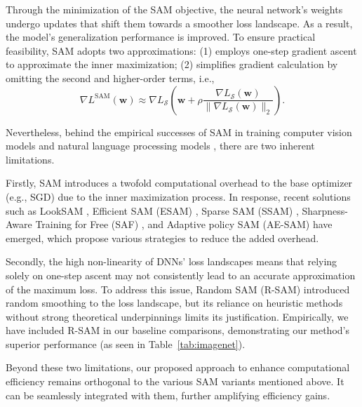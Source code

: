 \documentclass[letterpaper]{article} %
\theoremstyle{plain}
\theoremstyle{definition}
\newcommand{\tref}[1]{Table~\ref{#1}}
\begin{document}
Through the minimization of the SAM objective, the neural network's weights undergo updates that shift them towards a smoother loss landscape. As a result, the model's generalization performance is improved. To ensure practical feasibility, SAM adopts two approximations: (1) employs one-step gradient ascent to approximate the inner maximization; (2) simplifies gradient calculation by omitting the second and higher-order terms, i.e.,
\begin{equation}\label{eq:sam-approx}
\nabla L^{\operatorname{SAM}}(\boldsymbol{w}) \approx \nabla L_{\mathcal{S}}\left(\boldsymbol{w}+\rho \frac{\nabla L_{\mathcal{S}}(\boldsymbol{w})} {\|\nabla L_{\mathcal{S}}(\boldsymbol{w})\|_2}\right).
\end{equation}

Nevertheless, behind the empirical successes of SAM in training computer vision models \cite{foret2021sharpnessaware,chen2022when} and natural language processing models \cite{bahri2021sharpness}, there are two inherent limitations.

Firstly, SAM introduces a twofold computational overhead to the base optimizer (e.g., SGD) due to the inner maximization process. In response, recent solutions such as LookSAM \cite{liu2022towards}, Efficient SAM (ESAM) \cite{du2022efficient}, Sparse SAM (SSAM) \cite{mi2022make}, Sharpness-Aware Training for Free (SAF) \cite{du2022sharpness}, and Adaptive policy SAM (AE-SAM) \cite{jiang2023an} have emerged, which propose various strategies to reduce the added overhead. 

Secondly, the high non-linearity of DNNs' loss landscapes means that relying solely on one-step ascent may not consistently lead to an accurate approximation of the maximum loss. To address this issue, Random SAM (R-SAM) \cite{liu2022random} introduced random smoothing to the loss landscape, but its reliance on heuristic methods without strong theoretical underpinnings limits its justification. Empirically, we have included R-SAM in our baseline comparisons, demonstrating our method's superior performance (as seen in \tref{tab:imagenet}).

Beyond these two limitations, our proposed approach to enhance computational efficiency remains orthogonal to the various SAM variants mentioned above. It can be seamlessly integrated with them, further amplifying efficiency gains.
\end{document}

